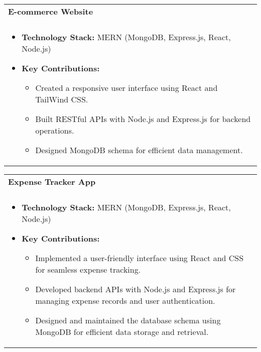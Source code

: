 \documentclass[a4paper,12pt]{article}
\begin{document}
\noindent
\begin{tabularx}{\linewidth}{ @{}X@{} }
    \textbf{E-commerce Website} \\ \\
    \begin{minipage}{\linewidth}
        \begin{itemize}
            \item \textbf{Technology Stack:} MERN (MongoDB, Express.js, React, Node.js)
            \item \textbf{Key Contributions:}
            \begin{itemize}
                \item Created a responsive user interface using React and TailWind CSS.
                \item Built RESTful APIs with Node.js and Express.js for backend operations.
                \item Designed MongoDB schema for efficient data management.
            \end{itemize}
        \end{itemize}
    \end{minipage}
\end{tabularx}

\noindent
\begin{tabularx}{\linewidth}{ @{}X@{} }
    \textbf{Expense Tracker App} \\ \\
    \begin{minipage}{\linewidth}
        \begin{itemize}
            \item \textbf{Technology Stack:} MERN (MongoDB, Express.js, React, Node.js)
            \item \textbf{Key Contributions:}
            \begin{itemize}
                \item Implemented a user-friendly interface using React and CSS for seamless expense tracking.
                \item Developed backend APIs with Node.js and Express.js for managing expense records and user authentication.
                \item Designed and maintained the database schema using MongoDB for efficient data storage and retrieval.
            \end{itemize}
        \end{itemize}
    \end{minipage}
\end{tabularx}
\end{document}
